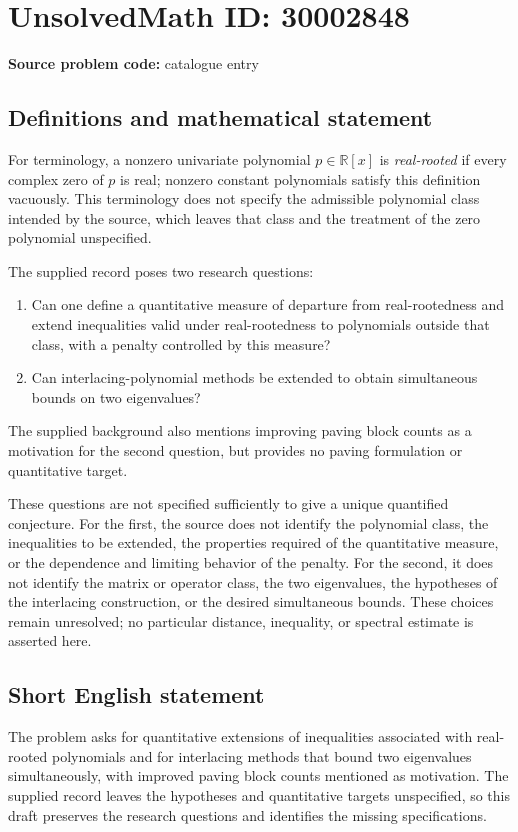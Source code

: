 \documentclass[11pt]{article}
\newcommand{\R}{\mathbb{R}}
\begin{document}
\section*{UnsolvedMath ID: 30002848}
\textbf{Source problem code:} catalogue entry
\subsection{Definitions and mathematical statement}
For terminology, a nonzero univariate polynomial \(p\in\R[x]\) is \emph{real-rooted} if every complex zero of \(p\) is real; nonzero constant polynomials satisfy this definition vacuously. This terminology does not specify the admissible polynomial class intended by the source, which leaves that class and the treatment of the zero polynomial unspecified.

The supplied record poses two research questions:
\begin{enumerate}
\item Can one define a quantitative measure of departure from real-rootedness and extend inequalities valid under real-rootedness to polynomials outside that class, with a penalty controlled by this measure?
\item Can interlacing-polynomial methods be extended to obtain simultaneous bounds on two eigenvalues?
\end{enumerate}
The supplied background also mentions improving paving block counts as a motivation for the second question, but provides no paving formulation or quantitative target.

These questions are not specified sufficiently to give a unique quantified conjecture. For the first, the source does not identify the polynomial class, the inequalities to be extended, the properties required of the quantitative measure, or the dependence and limiting behavior of the penalty. For the second, it does not identify the matrix or operator class, the two eigenvalues, the hypotheses of the interlacing construction, or the desired simultaneous bounds. These choices remain unresolved; no particular distance, inequality, or spectral estimate is asserted here.
\subsection{Short English statement}
The problem asks for quantitative extensions of inequalities associated with real-rooted polynomials and for interlacing methods that bound two eigenvalues simultaneously, with improved paving block counts mentioned as motivation. The supplied record leaves the hypotheses and quantitative targets unspecified, so this draft preserves the research questions and identifies the missing specifications.
\end{document}
